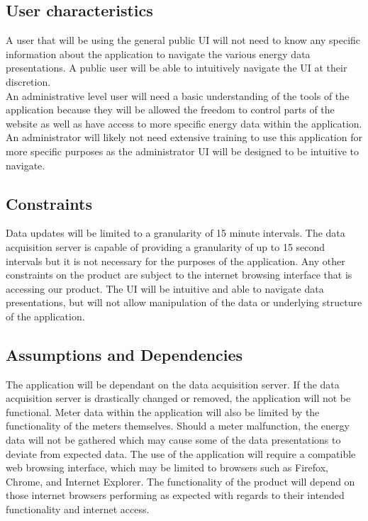 \documentclass[onecolumn, draftclsnofoot,10pt, compsoc]{IEEEtran}
\begin{document}
    \subsection{User characteristics}
    A user that will be using the general public UI will not need to know any specific information about the application to navigate the various energy data presentations. A public user will be able to intuitively navigate the UI at their discretion. \\ 
    An administrative level user will need a basic understanding of the tools of the application because they will be allowed the freedom to control parts of the website as well as have access to more specific energy data within the application. An administrator will likely not need extensive training to use this application for more specific purposes as the administrator UI will be designed to be intuitive to navigate.
    \subsection{Constraints}
    Data updates will be limited to a granularity of 15 minute intervals. The data acquisition server is capable of providing a granularity of up to 15 second intervals but it is not necessary for the purposes of the application. Any other constraints on the product are subject to the internet browsing interface that is accessing our product. The UI will be intuitive and able to navigate data presentations, but will not allow manipulation of the data or underlying structure of the application.
    
    \subsection{Assumptions and Dependencies}
    The application will be dependant on the data acquisition server. If the data acquisition server is drastically changed or removed, the application will not be functional. Meter data within the application will also be limited by the functionality of the meters themselves. Should a meter malfunction, the energy data will not be gathered which may cause some of the data presentations to deviate from expected data. The use of the application will require a compatible web browsing interface, which may be limited to browsers such as Firefox, Chrome, and Internet Explorer. The functionality of the product will depend on those internet browsers performing as expected with regards to their intended functionality and internet access. 
\end{document}
